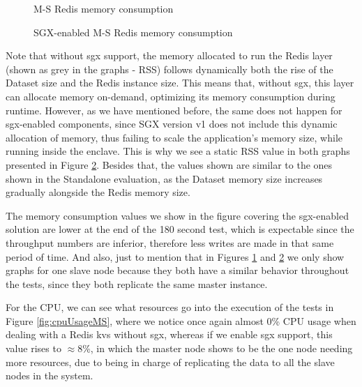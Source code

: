 \begin{figure}[htbp]
	\centering
	\caption{M-S Redis memory consumption}
	\label{fig:noSgxMemoryConsumption}
\end{figure}

\begin{figure}[htbp]
	\centering
	\caption{SGX-enabled M-S Redis memory consumption}
	\label{fig:sgxMemoryConsumption}
\end{figure}

Note that without \gls{sgx} support, the memory allocated to run the Redis layer (shown as grey in the graphs - RSS) follows dynamically both the rise of the Dataset size and the Redis instance size. This means that, without \gls{sgx}, this layer can allocate memory on-demand, optimizing its memory consumption during runtime. However, as we have mentioned before, the same does not happen for \gls{sgx}-enabled components, since SGX version v1 does not include this dynamic allocation of memory, thus failing to scale the application's memory size, while running inside the enclave. This is why we see a static RSS value in both graphs presented in Figure \ref{fig:sgxMemoryConsumption}. Besides that, the values shown are similar to the ones shown in the Standalone evaluation, as the Dataset memory size increases gradually alongside the Redis memory size. 

The memory consumption values we show in the figure covering the \gls{sgx}-enabled solution are lower at the end of the 180 second test, which is expectable since the throughput numbers are inferior, therefore less writes are made in that same period of time. And also, just to mention that in Figures \ref{fig:noSgxMemoryConsumption} and \ref{fig:sgxMemoryConsumption} we only show graphs for one slave node because they both have a similar behavior throughout the tests, since they both replicate the same master instance.

For the CPU, we can see what resources go into the execution of the tests in Figure \ref{fig:cpuUsageMS}, where we notice once again almost 0\% CPU usage when dealing with a Redis \gls{kvs} without \gls{sgx}, whereas if we enable \gls{sgx} support, this value rises to $\approx$8\%, in which the master node shows to be the one node needing more resources, due to being in charge of replicating the data to all the slave nodes in the system.

